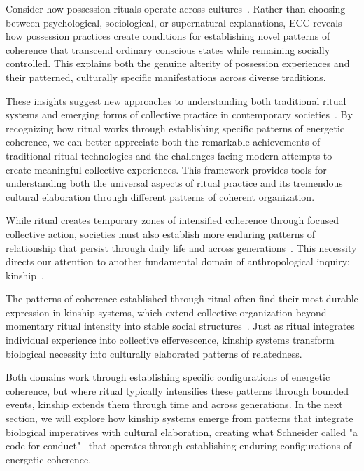Consider how possession rituals operate across cultures~\cite{boddy1994spirit,kapferer2004ritual}. Rather than choosing between psychological, sociological, or supernatural explanations, ECC reveals how possession practices create conditions for establishing novel patterns of coherence that transcend ordinary conscious states while remaining socially controlled. This explains both the genuine alterity of possession experiences and their patterned, culturally specific manifestations across diverse traditions.

These insights suggest new approaches to understanding both traditional ritual systems and emerging forms of collective practice in contemporary societies~\cite{kapferer2004ritual,tsing2015mushroom}. By recognizing how ritual works through establishing specific patterns of energetic coherence, we can better appreciate both the remarkable achievements of traditional ritual technologies and the challenges facing modern attempts to create meaningful collective experiences. This framework provides tools for understanding both the universal aspects of ritual practice and its tremendous cultural elaboration through different patterns of coherent organization.

While ritual creates temporary zones of intensified coherence through focused collective action, societies must also establish more enduring patterns of relationship that persist through daily life and across generations~. This necessity directs our attention to another fundamental domain of anthropological inquiry: kinship~.

The patterns of coherence established through ritual often find their most durable expression in kinship systems, which extend collective organization beyond momentary ritual intensity into stable social structures~\cite{sahlins2013what,carsten2004after}. Just as ritual integrates individual experience into collective effervescence, kinship systems transform biological necessity into culturally elaborated patterns of relatedness.

Both domains work through establishing specific configurations of energetic coherence, but where ritual typically intensifies these patterns through bounded events, kinship extends them through time and across generations. In the next section, we will explore how kinship systems emerge from patterns that integrate biological imperatives with cultural elaboration, creating what Schneider called "a code for conduct"~\cite{schneider1984critique} that operates through establishing enduring configurations of energetic coherence.
